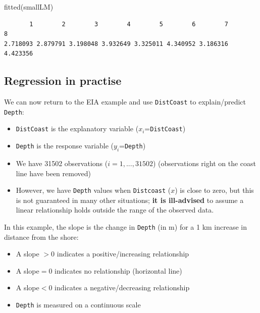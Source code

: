 \documentclass[
  oneside]{krantz}
\newenvironment{Shaded}{\begin{snugshade}}{\end{snugshade}}
\newcommand{\FunctionTok}[1]{\textcolor[rgb]{0.00,0.00,0.00}{#1}}
\newcommand{\NormalTok}[1]{#1}
\providecommand{\tightlist}{%
  \setlength{\itemsep}{0pt}\setlength{\parskip}{0pt}}
\begin{document}
\begin{Shaded}
\begin{Highlighting}[]
\FunctionTok{fitted}\NormalTok{(smallLM)}
\end{Highlighting}
\end{Shaded}

\begin{verbatim}
       1        2        3        4        5        6        7        8 
2.718093 2.879791 3.198048 3.932649 3.325011 4.340952 3.186316 4.423356 
\end{verbatim}

\hypertarget{regression-in-practise}{%
\subsection{Regression in practise}\label{regression-in-practise}}

We can now return to the EIA example and use \texttt{DistCoast} to explain/predict \texttt{Depth}:

\begin{itemize}
\tightlist
\item
  \texttt{DistCoast} is the explanatory variable (\(x_i\)=\texttt{DistCoast})
\item
  \texttt{Depth} is the response variable (\(y_i\)=\texttt{Depth})
\item
  We have 31502 observations (\(i=1,...,31502\)) (observations right on the coast line have been removed)
\item
  However, we have \texttt{Depth} values when \texttt{Distcoast} (\(x\)) is close to zero, but this is not guaranteed in many other situations; \textbf{it is ill-advised} to assume a linear relationship holds outside the range of the observed data.
\end{itemize}

In this example, the slope is the change in \texttt{Depth} (in m) for a 1 km increase in distance from the shore:

\begin{itemize}
\tightlist
\item
  A slope \(>0\) indicates a positive/increasing relationship
\item
  A slope\(=0\) indicates no relationship (horizontal line)
\item
  A slope\(<0\) indicates a negative/decreasing relationship
\item
  \texttt{Depth} is measured on a continuous scale
\end{itemize}
\end{document}

